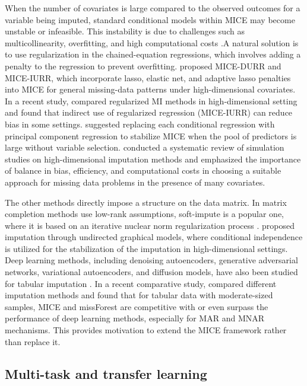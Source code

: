 \documentclass[12pt]{article}
\begin{document}
When the number of covariates is large compared to the observed outcomes for a variable being imputed, standard conditional models within MICE may become unstable or infeasible. This instability is due to challenges such as multicollinearity, overfitting, and high computational costs \citep{fan_selective_2010,tibshirani_elements_2009}.A natural solution is to use regularization in the chained-equation regressions, which involves adding a penalty to the regression to prevent overfitting. \citet{deng_multiple_2016} proposed MICE-DURR and
MICE-IURR, which incorporate lasso, elastic net, and adaptive lasso penalties into MICE for general missing-data patterns under high-dimensional covariates.  In a recent study, \citet{brini_missing_2024} compared regularized MI methods in high-dimensional setting and found that indirect use of regularized regression (MICE-IURR) can reduce bias in some settings. \citet{costantini_solving_2023} suggested replacing each conditional regression with principal component regression to stabilize MICE when the pool of predictors is large without variable selection. \citet{varol_review_2025} conducted a systematic review of simulation studies on high-dimensional imputation methods and emphasized the importance of balance in bias, efficiency, and computational costs in choosing a suitable approach for missing data problems in the presence of many covariates.

The other methods directly impose a structure on the data matrix. In matrix completion methods use low-rank assumptions, soft-impute is a popular one, where it is based on an iterative nuclear norm regularization process 
\citep{hastie_matrix_2015,mazumder_spectral_2010}. \citet{lee_high-dimensional_2024} proposed imputation through undirected graphical models, where conditional independence is utilized for the stabilization of the imputation in high-dimensional settings. Deep learning methods, including denoising autoencoders, generative adversarial networks, variational autoencoders, and diffusion models, have also been studied for tabular imputation
\citep{yoon_gain_2018,gondara_mida_2018,tashiro_csdi_2021,du_saits_2023}. In a recent comparative study, \citet{sun_deep_2023} compared different imputation methods and found that for tabular data with moderate-sized samples, MICE and missForest are competitive with or even surpass the performance of deep learning methods, especially for MAR and MNAR mechanisms. This provides motivation to extend the MICE framework rather than replace it.

\subsection{Multi-task and transfer learning}
\label{subsec:background_mtl}
\end{document}
